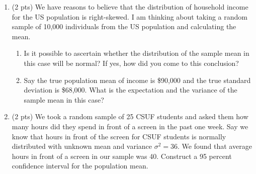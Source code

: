 \documentclass{./../../Latex/handout}
\begin{document}
\begin{enumerate}
\item (2 pts) We have reasons to believe that the distribution of household income
for the US population is right-skewed. I am thinking about
taking a random sample of 10,000 individuals from the US population
and calculating the mean.
\begin{enumerate}
  \item Is it possible to ascertain whether the distribution of the sample mean in this case will be normal? If yes, how did you come to this conclusion? \vspace{3.25cm}
\item Say the true population mean of income is \$90,000 and the true standard
deviation is \$68,000. What is the expectation and the variance of the sample mean in this case? \vspace{3.25cm}
\end{enumerate}

\item (2 pts) We took a random sample of 25 CSUF students and asked them how many hours did they spend in front of a screen in the past one week. Say we know that hours in front of the screen for CSUF students is normally distributed with unknown mean and variance $\sigma^2 = 36$.  We found that average hours in front of a screen in our sample was 40. Construct a 95 percent confidence interval for the population mean. \\

\end{enumerate}
\end{document}
